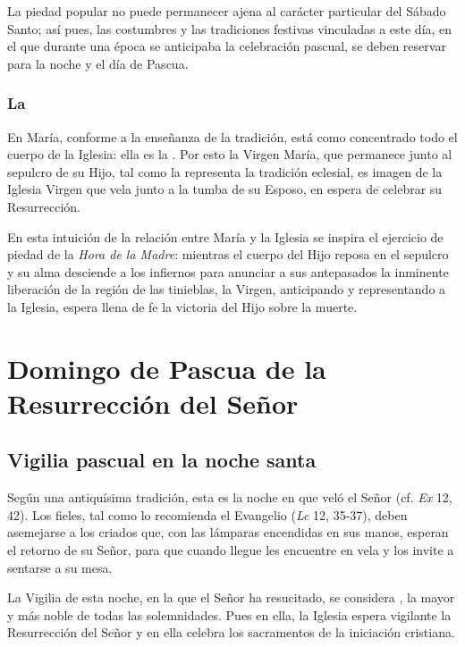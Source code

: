 \begin{introstyle}
La piedad popular no puede permanecer ajena al carácter particular del Sábado Santo; así pues, las costumbres y las tradiciones festivas vinculadas a este día, en el que durante una época se anticipaba la celebración pascual, se deben reservar para la noche y el día de Pascua.

\subsubsection{La }

En María, conforme a la enseñanza de la tradición, está como concentrado todo el cuerpo de la Iglesia: ella es la . Por esto la Virgen María, que permanece junto al sepulcro de su Hijo, tal como la representa la tradición eclesial, es imagen de la Iglesia Virgen que vela junto a la tumba de su Esposo, en espera de celebrar su Resurrección.

En esta intuición de la relación entre María y la Iglesia se inspira el ejercicio de piedad de la \textit{Hora de la Madre}: mientras el cuerpo del Hijo reposa en el sepulcro y su alma desciende a los infiernos para anunciar a sus antepasados la inminente liberación de la región de las tinieblas, la Virgen, anticipando y representando a la Iglesia, espera llena de fe la victoria del Hijo sobre la muerte.


\section{Domingo de Pascua de la Resurrección del Señor} 

\subsection{Vigilia pascual en la noche santa}

Según una antiquísima tradición, esta es la noche en que veló el Señor (cf. \textit{Ex} 12, 42). Los fieles, tal como lo recomienda el Evangelio (\textit{Lc} 12, 35-37), deben asemejarse a los criados que, con las lámparas encendidas en sus manos, esperan el retorno de su Señor, para que cuando llegue les encuentre en vela y los invite a sentarse a su mesa.

La Vigilia de esta noche, en la que el Señor ha resucitado, se considera , la mayor y más noble de todas las solemnidades. Pues en ella, la Iglesia espera vigilante la Resurrección del Señor y en ella celebra los sacramentos de la iniciación cristiana.


\end{introstyle}
